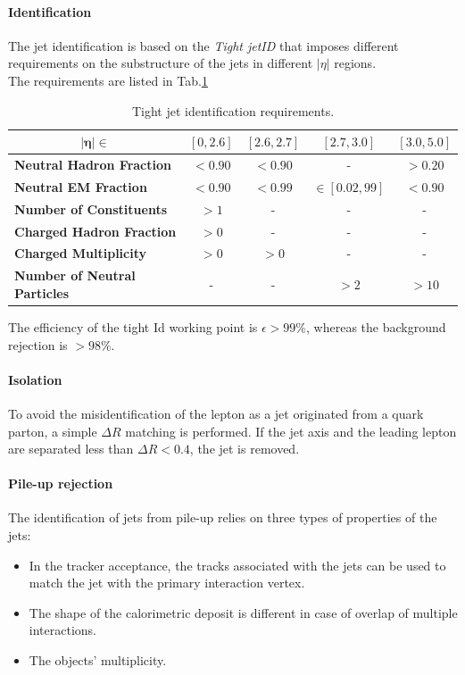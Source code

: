 \paragraph*{Identification}
The jet identification is based on the \emph{Tight jetID} that imposes different requirements on the substructure of the jets in different $|\eta|$ regions.\\
The requirements are listed in Tab.\ref{tab:jet_id}

\begin{table}[H]
    \centering
    \fontsize{11pt}{11pt}\selectfont
    \begin{tabular}{l|c|c|c|c}
        \toprule
         \multicolumn{1}{c|}{$\bm{|\eta|\in}$}&  $[0,2.6]$& $[2.6,2.7]$ & $[2.7,3.0]$ & $[3.0,5.0]$\\
         \midrule
         \textbf{Neutral Hadron Fraction} & $<0.90$ &  $<0.90$ & - & $>0.20$\\
         \midrule
         \textbf{Neutral EM Fraction} & $<0.90$ & $<0.99$ & $\in[0.02,99]$ & $<0.90$\\
         \midrule
         \textbf{Number of Constituents } & $>1$ & - & - &  -\\
         \midrule
         \textbf{Charged Hadron Fraction} & $>0$ & - & - & -\\
         \midrule
         \textbf{Charged Multiplicity} & $>0$ & $>0$ & - & -\\
         \midrule
         \textbf{Number of Neutral Particles}& - & - & $>2$ & $>10$\\
         \bottomrule
    \end{tabular}
    \caption{Tight jet identification requirements.}
    \label{tab:jet_id}
\end{table}
The efficiency of the tight Id working point is $\epsilon>99\%$, whereas the background rejection is $>98\%$. 
\paragraph*{Isolation} 
To avoid the misidentification of the lepton as a jet originated from a quark parton, a simple $\Delta R$ matching is performed. If the jet axis and the leading lepton are separated less than $\Delta R<0.4$, the jet is removed. 

\paragraph*{Pile-up rejection}
The identification of jets from pile-up relies on three types of properties of the jets:
\begin{itemize}
    \item  In the tracker acceptance, the tracks associated with the jets can be used to match the jet with the primary interaction vertex.
    \item The shape of the calorimetric deposit is different in case of overlap of multiple interactions.
    \newpage
    \item The objects' multiplicity.
\end{itemize}


